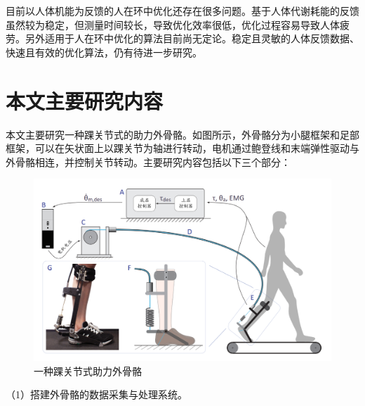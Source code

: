 目前以人体机能为反馈的人在环中优化还存在很多问题。基于人体代谢耗能的反馈虽然较为稳定，但测量时间较长，导致优化效率很低，优化过程容易导致人体疲劳。另外适用于人在环中优化的算法目前尚无定论。稳定且灵敏的人体反馈数据、快速且有效的优化算法，仍有待进一步研究。

\section{本文主要研究内容}

本文主要研究一种踝关节式的助力外骨骼\cite{p42}。如图所示，外骨骼分为小腿框架和足部框架，可以在矢状面上以踝关节为轴进行转动，电机通过鲍登线和末端弹性驱动与外骨骼相连，并控制关节转动。主要研究内容包括以下三个部分：

\begin{figure}[htb]
    \includegraphics[width=15cm]{fig/f19.png}
    \caption{一种踝关节式助力外骨骼\cite{p43}}
    \label{fig:mark}
\end{figure}

（1）搭建外骨骼的数据采集与处理系统。
